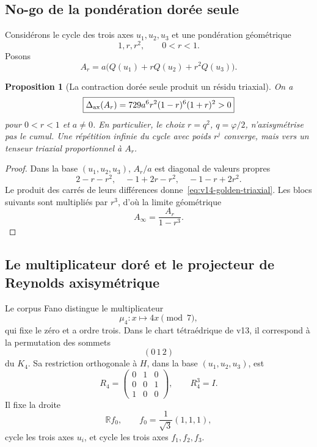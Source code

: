 \documentclass[11pt,a4paper]{article}
\newtheorem{proposition}[theorem]{Proposition}
\newcommand{\R}{\mathbb R}
\begin{document}
\subsection{No-go de la pondération dorée seule}

Considérons le cycle des trois axes $u_1,u_2,u_3$ et une pondération géométrique
\[
 1,r,r^2,\qquad 0<r<1.
\]
Posons
\[
 A_r=a\bigl(Q(u_1)+rQ(u_2)+r^2Q(u_3)\bigr).
\]

\begin{proposition}[La contraction dorée seule produit un résidu triaxial]\label{prop:v14-golden-triaxial}
On a
\begin{equation}\label{eq:v14-golden-triaxial}
 \boxed{
 \Delta_{\rm ax}(A_r)
 =
 729a^6r^2(1-r)^6(1+r)^2>0}
\end{equation}
pour $0<r<1$ et $a\ne0$.
En particulier, le choix $r=q^2$, $q=\varphi/2$, n'axisymétrise pas le cumul. Une répétition infinie du cycle avec poids $r^j$ converge, mais vers un tenseur triaxial proportionnel à $A_r$.
\end{proposition}

\begin{proof}
Dans la base $(u_1,u_2,u_3)$, $A_r/a$ est diagonal de valeurs propres
\[
 2-r-r^2,\quad
 -1+2r-r^2,\quad
 -1-r+2r^2.
\]
Le produit des carrés de leurs différences donne~\eqref{eq:v14-golden-triaxial}. Les blocs suivants sont multipliés par $r^3$, d'où la limite géométrique
\[
 A_\infty=\frac{A_r}{1-r^3}.
\]
\end{proof}

\subsection{Le multiplicateur doré et le projecteur de Reynolds axisymétrique}

Le corpus Fano distingue le multiplicateur
\[
 \mu_4:x\longmapsto4x\pmod7,
\]
qui fixe le zéro et a ordre trois. Dans le chart tétraédrique de v13, il correspond à la permutation des sommets
\[
 (0\,1\,2)
\]
du $K_4$. Sa restriction orthogonale à $H$, dans la base $(u_1,u_2,u_3)$, est
\begin{equation}\label{eq:v14-R4}
 \boxed{
 R_4=
 \begin{pmatrix}
 0&1&0\\
 0&0&1\\
 1&0&0
 \end{pmatrix},
 \qquad
 R_4^3=I.}
\end{equation}
Il fixe la droite
\[
 \R f_0,\qquad f_0=\frac1{\sqrt3}(1,1,1),
\]
cycle les trois axes $u_i$, et cycle les trois axes $f_1,f_2,f_3$.
\end{document}
